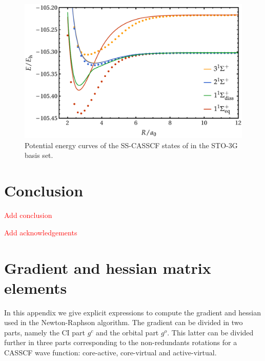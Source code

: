 \documentclass[aps,prb,reprint,showkeys,superscriptaddress]{revtex4-1}
\newcommand{\todo}[1]{\textcolor{red}{#1}}
\begin{document}
\begin{figure}
  \centering
  \includegraphics[width=0.9\linewidth]{Figures/fig_7.pdf}
  \caption{Potential energy curves of the SS-CASSCF states of  in the STO-3G basis set. \label{fig:fig_7}}
\end{figure}

\section{Conclusion}
\label{sec:conclusion}

\todo{Add conclusion}

\begin{acknowledgements}
\todo{Add acknowledgements}
\end{acknowledgements}

\appendix

\section{Gradient and hessian matrix elements}
\label{app:appendixA}

In this appendix we give explicit expressions to compute the gradient and hessian used in the Newton-Raphson algorithm.
The gradient can be divided in two parts, namely the CI part $g^c$ and the orbital part $g^o$.
This latter can be divided further in three parts corresponding to the non-redundants rotations for a CASSCF wave function: core-active, core-virtual and active-virtual.
\end{document}
